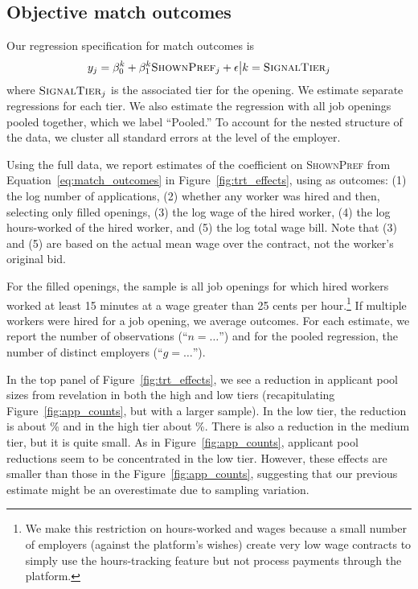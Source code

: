 \documentclass[12pt]{article}
\begin{document}
\subsection{Objective match outcomes} 
Our regression specification for match outcomes is 
\begin{align} \label{eq:match_outcomes}
  y_j = \beta^k_0 + \beta^k_1 \textsc{ShownPref}_j + \epsilon  \big| k = \textsc{SignalTier}_{j}
\end{align}
where $\textsc{SignalTier}_{j}$ is the associated tier for the opening. 
We estimate separate regressions for each tier.
We also estimate the regression with all job openings pooled together, which we label ``Pooled.'' 
To account for the nested structure of the data, we cluster all standard errors at the level of the employer. 

Using the full data, we report estimates of the coefficient on \textsc{ShownPref} from Equation~\ref{eq:match_outcomes} in Figure~\ref{fig:trt_effects}, using as outcomes:
(1) the log number of applications,
(2) whether any worker was hired and 
then, selecting only filled openings, 
(3) the log wage of the hired worker,
(4) the log hours-worked of the hired worker, 
and (5) the log total wage bill.
Note that (3) and (5) are based on the actual mean wage over the contract, not the worker's original bid. 

For the filled openings, the sample is all job openings for which hired workers worked at least 15 minutes at a wage greater than 25 cents per hour.\footnote{
  We make this restriction on hours-worked and wages because a small number of employers (against the platform's wishes) create very low wage contracts to simply use the hours-tracking feature but not process payments through the platform.
}
If multiple workers were hired for a job opening, we average outcomes. 
For each estimate, we report the number of observations (``$n=\ldots$'') and for the pooled regression, the number of distinct employers (``$g=\ldots$'').

In the top panel of Figure~\ref{fig:trt_effects}, we see a reduction in applicant pool sizes from revelation in both the high and low tiers (recapitulating Figure~\ref{fig:app_counts}, but with a larger sample).
In the low tier, the reduction is about \NumAppsEffectLow{}\% and in the high tier about \NumAppsEffectHigh{}\%.
There is also a reduction in the medium tier, but it is quite small. 
As in Figure~\ref{fig:app_counts}, applicant pool reductions seem to be concentrated in the low tier.
However, these effects are smaller than those in the Figure~\ref{fig:app_counts}, suggesting that our previous estimate might be an overestimate due to sampling variation.
\end{document}

